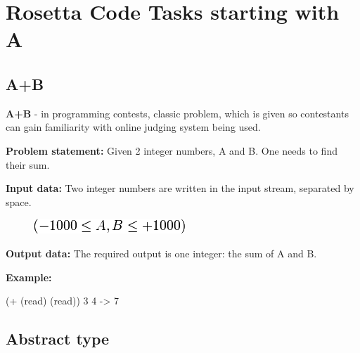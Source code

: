 %
%
%

\chapter{Rosetta Code Tasks starting with A}
\label{rosettacode-numbers}

\section*{A+B}

\textbf{A+B} - in programming contests, classic problem, which is given
so contestants can gain familiarity with online judging system being
used.

\textbf{Problem statement:} Given 2 integer numbers, A and B. One
needs to find their sum.

\textbf{Input data:} Two integer numbers are written in the input
stream, separated by space.

\begin{figure}[htbp]
\centering
\includegraphics[scale=.6]{graphics/a344abb2a9a00cb2de6679a485115ce3.png}
\end{figure}

\textbf{Output data:} The required output is one integer: the sum of A
and B.

\textbf{Example:}




\begin{wideverbatim}

(+ (read) (read))
3 4
-> 7

\end{wideverbatim}

\pagebreak{}
\section*{Abstract type}

